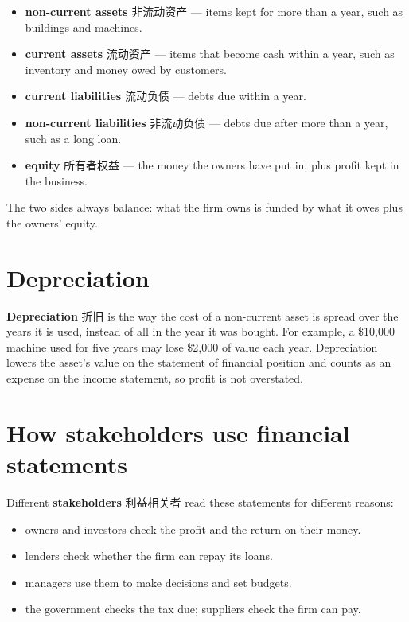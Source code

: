 \documentclass[11pt]{article}
\begin{document}
\begin{itemize}
\item \textbf{non-current assets} 非流动资产 — items kept for more than a year, such as buildings and machines.

\item \textbf{current assets} 流动资产 — items that become cash within a year, such as inventory and money owed by customers.

\item \textbf{current liabilities} 流动负债 — debts due within a year.

\item \textbf{non-current liabilities} 非流动负债 — debts due after more than a year, such as a long loan.

\item \textbf{equity} 所有者权益 — the money the owners have put in, plus profit kept in the business.

\end{itemize}

The two sides always balance: what the firm owns is funded by what it owes plus the owners' equity.

\section*{Depreciation}

\textbf{Depreciation} 折旧 is the way the cost of a non-current asset is spread over the years it is used, instead of all in the year it was bought. For example, a \$10,000 machine used for five years may lose \$2,000 of value each year. Depreciation lowers the asset's value on the statement of financial position and counts as an expense on the income statement, so profit is not overstated.

\section*{How stakeholders use financial statements}

Different \textbf{stakeholders} 利益相关者 read these statements for different reasons:

\begin{itemize}
\item owners and investors check the profit and the return on their money.

\item lenders check whether the firm can repay its loans.

\item managers use them to make decisions and set budgets.

\item the government checks the tax due; suppliers check the firm can pay.

\end{itemize}
\end{document}
